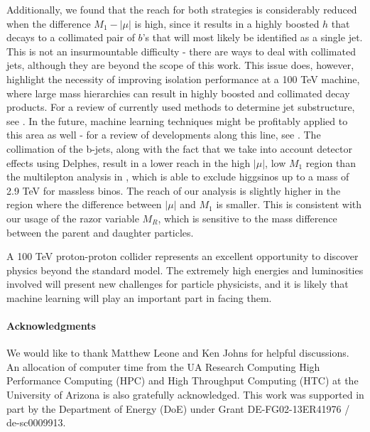 Additionally, we found that the reach for both strategies is considerably reduced when the difference $M_1 - |\mu|$ is high, since it results in a highly boosted $h$ that decays to a collimated pair of $b$'s that will most likely be identified as a single jet. This is not an insurmountable difficulty - there are ways to deal with collimated jets, although they are beyond the scope of this work. This issue does, however, highlight the necessity of improving isolation performance at a 100 TeV machine, where large mass hierarchies can result in highly boosted and collimated decay products. For a review of currently used methods to determine jet substructure, see \citep{Shelton:2013an}. In the future, machine learning techniques might be profitably applied to this area as well - for a review of developments along this line, see \citep{Schwartzman:2016jqu}. The collimation of the b-jets, along with the fact that we take into account detector effects using Delphes, result in a lower reach in the high $|\mu|$, low $M_1$ region than the multilepton analysis in \citep{Gori:2014oua}, which is able to exclude higgsinos up to a mass of 2.9 TeV for massless binos. The reach of our analysis is slightly higher in the region where the difference between $|\mu|$ and $M_1$ is smaller. This is consistent with our usage of the razor variable $M_R$, which is sensitive to the mass difference between the parent and daughter particles.

A 100 TeV proton-proton collider represents an excellent opportunity to discover physics beyond the standard model. The extremely high energies and luminosities involved will present new challenges for particle physicists, and it is likely that machine learning will play an important part in facing them. 

\paragraph{Acknowledgments}
We would like to thank Matthew Leone and Ken Johns for helpful discussions. An allocation of computer time from the UA Research Computing High Performance Computing (HPC) and High Throughput Computing (HTC) at the University of Arizona is also gratefully acknowledged. This work was supported in part by the Department of Energy (DoE) under Grant DE-FG02-13ER41976 / de-sc0009913.

